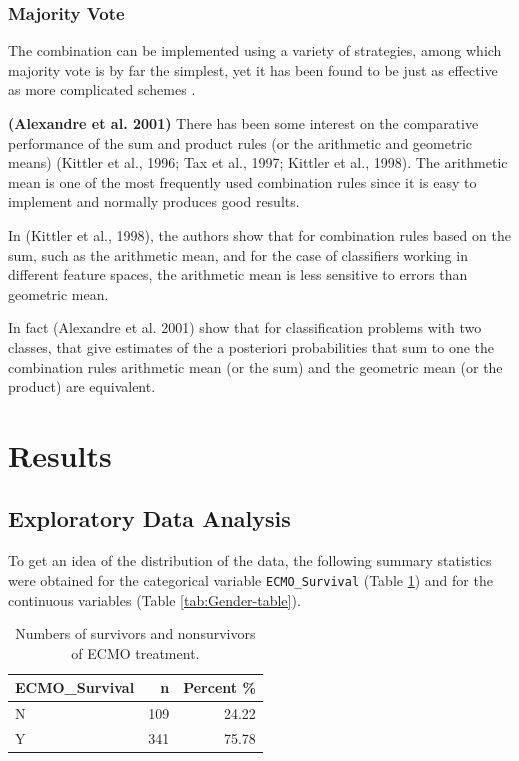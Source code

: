 \documentclass[12pt,]{article}
\begin{document}
\subsubsection{Majority Vote}\label{majority-vote}

The combination can be implemented using a variety of strategies, among
which majority vote is by far the simplest, yet it has been found to be
just as effective as more complicated schemes \citep{lam_optimal_1995}.

\textbf{(Alexandre et al. 2001)} There has been some interest on the
comparative performance of the sum and product rules (or the arithmetic
and geometric means) (Kittler et al., 1996; Tax et al., 1997; Kittler et
al., 1998). The arithmetic mean is one of the most frequently used
combination rules since it is easy to implement and normally produces
good results.

In (Kittler et al., 1998), the authors show that for combination rules
based on the sum, such as the arithmetic mean, and for the case of
classifiers working in different feature spaces, the arithmetic mean is
less sensitive to errors than geometric mean.

In fact (Alexandre et al. 2001) show that for classification problems
with two classes, that give estimates of the a posteriori probabilities
that sum to one the combination rules arithmetic mean (or the sum) and
the geometric mean (or the product) are equivalent.

\newpage

\section{Results}\label{results}

\subsection{Exploratory Data Analysis}\label{exploratory-data-analysis}

To get an idea of the distribution of the data, the following summary
statistics were obtained for the categorical variable
\texttt{ECMO\_Survival} (Table \ref{tab:ECMO_Survival-table}) and for
the continuous variables (Table \ref{tab:Gender-table}).

\begin{table}[!h]

\caption{\label{tab:unnamed-chunk-1}\label{tab:ECMO_Survival-table} Numbers of survivors and nonsurvivors of ECMO treatment.}
\centering
\fontsize{10}{12}\selectfont
\begin{tabular}{lrr}
\toprule
ECMO\_Survival & n & Percent \%\\
\midrule
N & 109 & 24.22\\
Y & 341 & 75.78\\
\bottomrule
\end{tabular}
\end{table}
\end{document}
